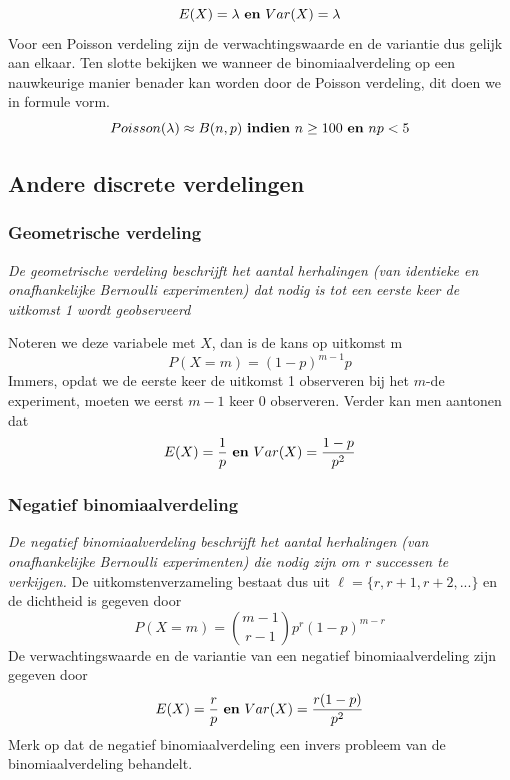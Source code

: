 \documentclass[titlepage]{article}
\numberwithin{equation}{section}
\begin{document}
 \begin{equation}
 	E(X) = \lambda \text{ \textbf{en} } Var(X) = \lambda
 	\label{4.7}
 \end{equation}
 Voor een Poisson verdeling zijn de verwachtingswaarde en de variantie dus gelijk aan elkaar.\newline\newline
 Ten slotte bekijken we wanneer de binomiaalverdeling op een nauwkeurige manier benader kan worden door de Poisson verdeling, dit doen we in formule vorm.
 \begin{equation}
 	Poisson(\lambda)\approx B(n,p) \text{ \textbf{indien} } n \geq100 \text{ \textbf{en} } np <5
 	\label{4.8}
 \end{equation}
 \subsection{Andere discrete verdelingen}
 \subsubsection{Geometrische verdeling}
 \emph{De geometrische verdeling beschrijft het aantal herhalingen (van identieke en onafhankelijke Bernoulli experimenten) dat nodig is tot een eerste keer de uitkomst 1 wordt geobserveerd}\newline\newline
 
 Noteren we deze variabele met $X$, dan is de kans op uitkomst m
 \begin{equation*}
 	P(X=m)=(1-p)^{m-1}p
 \end{equation*}
 Immers, opdat we de eerste keer de uitkomst 1 observeren bij het $m$-de experiment, moeten we eerst $m-1$ keer 0 observeren. Verder kan men aantonen dat
 \begin{equation*}
 	E(X)=\frac{1}{p} \text{ \textbf{en} } Var(X) = \frac{1-p}{p^2}
 \end{equation*}
 \subsubsection{Negatief binomiaalverdeling}
 \emph{De negatief binomiaalverdeling beschrijft het aantal herhalingen (van onafhankelijke Bernoulli experimenten) die nodig zijn om r successen te verkijgen.}\newline\newline
 De uitkomstenverzameling bestaat dus uit $\ell = \{r, r+1, r+2, ...\}$ en de dichtheid is gegeven door
\begin{equation*}
	P(X=m)=\binom{m-1}{r-1}p^r(1-p)^{m-r}
\end{equation*}
De verwachtingswaarde en de variantie van een negatief binomiaalverdeling zijn gegeven door
\begin{equation*}
	E(X)=\frac{r}{p} \text{ \textbf{en} } Var(X) = \frac{r(1-p)}{p^2}
\end{equation*}
\danger Merk op dat de negatief binomiaalverdeling een invers probleem van de binomiaalverdeling behandelt.
\end{document}
